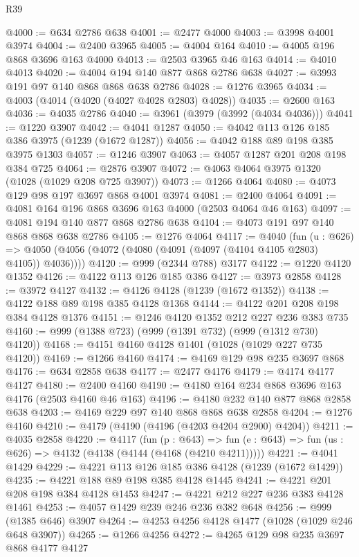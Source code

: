 \begin{lexlean}{R39}
\begin{coremodule}
@4000 := @634 @2786 @638
@4001 := @2477 @4000
@4003 := @3998 @4001 @3974
@4004 := @2400 @3965
@4005 := @4004 @164
@4010 := @4005 @196 @868 @3696 @163 @4000
@4013 := @2503 @3965 @46 @163
@4014 := @4010 @4013
@4020 := @4004 @194 @140 @877 @868 @2786 @638
@4027 := @3993 @191 @97 @140 @868 @868 @638 @2786
@4028 := @1276 @3965
@4034 := @4003 (@4014 (@4020 (@4027 @4028 @2803) @4028))
@4035 := @2600 @163
@4036 := @4035 @2786
@4040 := @3961 (@3979 (@3992 (@4034 @4036)))
@4041 := @1220 @3907
@4042 := @4041 @1287
@4050 := @4042 @113 @126 @185 @386 @3975 (@1239 (@1672 @1287))
@4056 := @4042 @188 @89 @198 @385 @3975 @1303
@4057 := @1246 @3907
@4063 := @4057 @1287 @201 @208 @198 @384 @725
@4064 := @2876 @3907
@4072 := @4063 @4064 @3975 @1320 (@1028 (@1029 @208 @725 @3907))
@4073 := @1266 @4064
@4080 := @4073 @129 @98 @197 @3697 @868 @4001 @3974
@4081 := @2400 @4064
@4091 := @4081 @164 @196 @868 @3696 @163 @4000 (@2503 @4064 @46 @163)
@4097 := @4081 @194 @140 @877 @868 @2786 @638
@4104 := @4073 @191 @97 @140 @868 @868 @638 @2786
@4105 := @1276 @4064
@4117 := @4040
    (fun (u : @626) =>
    @4050 (@4056 (@4072 (@4080 (@4091 (@4097 (@4104 @4105 @2803) @4105)) @4036))))
@4120 := @999 (@2344 @788) @3177
@4122 := @1220 @4120 @1352
@4126 := @4122 @113 @126 @185 @386
@4127 := @3973 @2858
@4128 := @3972 @4127
@4132 := @4126 @4128 (@1239 (@1672 @1352))
@4138 := @4122 @188 @89 @198 @385 @4128 @1368
@4144 := @4122 @201 @208 @198 @384 @4128 @1376
@4151 := @1246 @4120 @1352 @212 @227 @236 @383 @735
@4160 := @999 (@1388 @723) (@999 (@1391 @732) (@999 (@1312 @730) @4120))
@4168 := @4151 @4160 @4128 @1401 (@1028 (@1029 @227 @735 @4120))
@4169 := @1266 @4160
@4174 := @4169 @129 @98 @235 @3697 @868
@4176 := @634 @2858 @638
@4177 := @2477 @4176
@4179 := @4174 @4177 @4127
@4180 := @2400 @4160
@4190 := @4180 @164 @234 @868 @3696 @163 @4176 (@2503 @4160 @46 @163)
@4196 := @4180 @232 @140 @877 @868 @2858 @638
@4203 := @4169 @229 @97 @140 @868 @868 @638 @2858
@4204 := @1276 @4160
@4210 := @4179 (@4190 (@4196 (@4203 @4204 @2900) @4204))
@4211 := @4035 @2858
@4220 := @4117
    (fun (p : @643) =>
    fun (e : @643) => fun (us : @626) => @4132 (@4138 (@4144 (@4168 (@4210 @4211)))))
@4221 := @4041 @1429
@4229 := @4221 @113 @126 @185 @386 @4128 (@1239 (@1672 @1429))
@4235 := @4221 @188 @89 @198 @385 @4128 @1445
@4241 := @4221 @201 @208 @198 @384 @4128 @1453
@4247 := @4221 @212 @227 @236 @383 @4128 @1461
@4253 := @4057 @1429 @239 @246 @236 @382 @648
@4256 := @999 (@1385 @646) @3907
@4264 := @4253 @4256 @4128 @1477 (@1028 (@1029 @246 @648 @3907))
@4265 := @1266 @4256
@4272 := @4265 @129 @98 @235 @3697 @868 @4177 @4127

\end{coremodule}
\end{lexlean}
